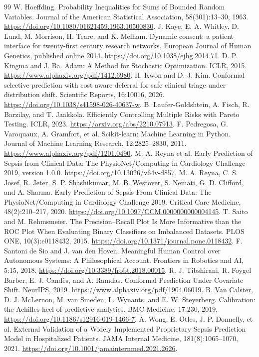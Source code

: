 \begin{thebibliography}{99}
 W. Hoeffding. Probability Inequalities for Sums of Bounded Random Variables. Journal of the American Statistical Association, 58(301):13--30, 1963. \url{https://doi.org/10.1080/01621459.1963.10500830}.
 J. Kaye, E. A. Whitley, D. Lund, M. Morrison, H. Teare, and K. Melham. Dynamic consent: a patient interface for twenty-first century research networks. European Journal of Human Genetics, published online 2014. \url{https://doi.org/10.1038/ejhg.2014.71}.
 D. P. Kingma and J. Ba. Adam: A Method for Stochastic Optimization. ICLR, 2015. \url{https://www.alphaxiv.org/pdf/1412.6980}.
 H. Kwon and D.-J. Kim. Conformal selective prediction with cost aware deferral for safe clinical triage under distribution shift. Scientific Reports, 16:10016, 2026. \url{https://doi.org/10.1038/s41598-026-40637-w}.
 B. Laufer-Goldshtein, A. Fisch, R. Barzilay, and T. Jaakkola. Efficiently Controlling Multiple Risks with Pareto Testing. ICLR, 2023. \url{https://arxiv.org/abs/2210.07913}.
 F. Pedregosa, G. Varoquaux, A. Gramfort, et al. Scikit-learn: Machine Learning in Python. Journal of Machine Learning Research, 12:2825--2830, 2011. \url{https://www.alphaxiv.org/pdf/1201.0490}.
 M. A. Reyna et al. Early Prediction of Sepsis from Clinical Data: The PhysioNet/Computing in Cardiology Challenge 2019, version 1.0.0. \url{https://doi.org/10.13026/v64v-d857}.
 M. A. Reyna, C. S. Josef, R. Jeter, S. P. Shashikumar, M. B. Westover, S. Nemati, G. D. Clifford, and A. Sharma. Early Prediction of Sepsis From Clinical Data: The PhysioNet/Computing in Cardiology Challenge 2019. Critical Care Medicine, 48(2):210--217, 2020. \url{https://doi.org/10.1097/CCM.0000000000004145}.
 T. Saito and M. Rehmsmeier. The Precision--Recall Plot Is More Informative than the ROC Plot When Evaluating Binary Classifiers on Imbalanced Datasets. PLOS ONE, 10(3):e0118432, 2015. \url{https://doi.org/10.1371/journal.pone.0118432}.
 F. Santoni de Sio and J. van den Hoven. Meaningful Human Control over Autonomous Systems: A Philosophical Account. Frontiers in Robotics and AI, 5:15, 2018. \url{https://doi.org/10.3389/frobt.2018.00015}.
 R. J. Tibshirani, R. Foygel Barber, E. J. Cand\`es, and A. Ramdas. Conformal Prediction Under Covariate Shift. NeurIPS, 2019. \url{https://www.alphaxiv.org/pdf/1904.06019}.
 B. Van Calster, D. J. McLernon, M. van Smeden, L. Wynants, and E. W. Steyerberg. Calibration: the Achilles heel of predictive analytics. BMC Medicine, 17:230, 2019. \url{https://doi.org/10.1186/s12916-019-1466-7}.
 A. Wong, E. Otles, J. P. Donnelly, et al. External Validation of a Widely Implemented Proprietary Sepsis Prediction Model in Hospitalized Patients. JAMA Internal Medicine, 181(8):1065--1070, 2021. \url{https://doi.org/10.1001/jamainternmed.2021.2626}.
\end{thebibliography}
